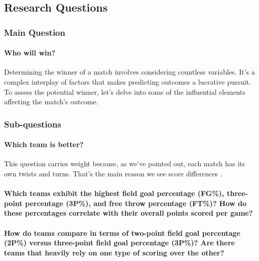 \documentclass[conference]{IEEEtran}
\begin{document}
\subsection{Research Questions}


\subsubsection{Main Question}


\vspace{\baselineskip}
\paragraph {Who will win?}
Determining the winner of a match involves considering countless variables. It's a complex interplay of factors that makes predicting outcomes a lucrative pursuit. To assess the potential winner, let's delve into some of the influential elements affecting the match's outcome.






\vspace{\baselineskip}

\subsubsection{Sub-questions}
\vspace{\baselineskip}
\vspace{\baselineskip}
\vspace{\baselineskip}

\paragraph {Which team is better?}

This question carries weight because, as we've pointed out, each match has its own twists and turns. That's the main reason we see score differences .

\paragraph {Which teams exhibit the highest field goal percentage (FG\%), three-point percentage (3P\%), and free throw percentage (FT\%)? How do these percentages correlate with their overall points scored per game? }

\vspace{\baselineskip}
\paragraph {How do teams compare in terms of two-point field goal percentage (2P\%) versus three-point field goal percentage (3P\%)? Are there teams that heavily rely on one type of scoring over the other?
}
\vspace{\baselineskip}
\end{document}
